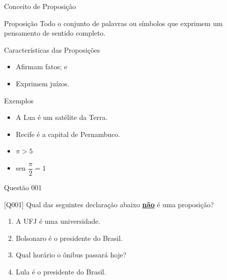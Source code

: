 \documentclass[xcolor=dvipsnames,table]{beamer}
\begin{document}
 \begin{frame}{Conceito de Proposição}
 \begin{block}{Proposição}
 	Todo o conjunto de palavras ou símbolos que exprimem um pensamento de sentido completo.
 \end{block} \pause
 \begin{block}{Características das Proposições}
 	\begin{itemize}[label=-] \pause
 		\item Afirmam fatos; e  \pause
 		\item Exprimem juízos.
 	\end{itemize}
 \end{block} \pause
 \begin{block}{Exemplos}
 	\begin{itemize}[label=-]
 		\item A Lua é um satélite da Terra.
 		\item Recife é a capital de Pernambuco.
 		\item $\pi > 5$
 		\item sen $\dfrac{\pi}{2} = 1$
 	\end{itemize}
 \end{block}
 \end{frame}

 \begin{frame}{Questão 001}
 \begin{block}{[Q001]}
 	Qual das seguintes declaração abaixo \underline{\bf não} é uma proposição?
 \end{block}
 \begin{enumerate}[label=(\Alph*)]
 	\item A UFJ é uma universidade.
 	\item Bolsonaro é o presidente do Brasil.
 	\item Qual horário o ônibus passará hoje?
 	\item Lula é o presidente do Brasil.
 \end{enumerate}
 \end{frame}

\end{document}
